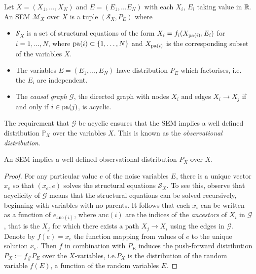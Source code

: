 \begin{definition}\label{def:causality-classical-sem}
Let $X = (X_1, \ldots, X_N)$ and $E = (E_1, \ldots E_N)$ with each $X_i$, $E_i$ taking value in $\mathbb{R}$. An SEM $\mathcal{M}_X$ over $X$ is a tuple $(\mathcal{S}_X, P_E)$ where
\begin{itemize}
	\item $\mathcal{S}_X$ is a set of structural equations of the form $X_i = f_i(X_{\operatorname{pa}(i)}, E_i)$ for $i=1,\ldots,N$, where 
$\operatorname{pa}(i) \subset \{1,\ldots,N\}$ and $X_{\operatorname{pa}(i)}$ is the corresponding subset of the variables $X$.
	\item The variables $E = (E_1,\ldots,E_N)$ have distribution $P_E$ which factorises, i.e. the $E_i$ are independent.
	\item The \emph{causal graph} $\mathcal{G}$, the directed graph with nodes $X_i$ and edges $X_i \to X_j$ if and only if $i \in \operatorname{pa}(j)$, is acyclic.
\end{itemize}
\end{definition}

The requirement that $\mathcal{G}$ be acyclic ensures that the SEM implies a well defined distribution $\mathbb{P}_X$ over the variables $X$. This is known as the \emph{observational distribution}.

\medskip

\begin{lemma}\label{lemma:acyclic-sem-well-defined-obs-dist}
An SEM implies a well-defined observational distribution $P_X$ over $X$.
\end{lemma}

\begin{proof}
For any particular value $e$ of the noise variables $E$, there is a unique vector $x_e$ so that $(x_e, e)$ solves the structural equations $\mathcal{S}_X$. To see this, observe that acyclicity of $\mathcal{G}$ means that the structural equations can be solved recursively, beginning with variables with no parents. It follows that each $x_i$ can be written as a function of $e_{\text{anc}(i)}$, where $\text{anc}(i)$ are the indices of the \emph{ancestors} of $X_i$ in $\mathcal{G}$, that is the $X_j$ for which there exists a path $X_j \to X_i$ using the edges in $\mathcal{G}$. 
Denote by $f(e) = x_e$ the function mapping from values of $e$ to the unique solution $x_e$.
Then $f$ in combination with $P_E$ induces the push-forward distribution $P_X := f_\# P_E$ over the $X$-variables, i.e.\:$P_X$ is the distribution of the random variable $f(E)$, a function of the random variables $E$.
\end{proof}

